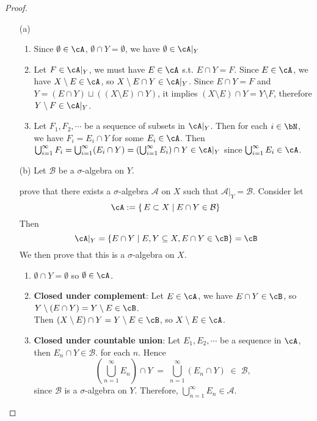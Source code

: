 \documentclass[lang=cn,11pt]{elegantbook}
\begin{document}
\begin{proof}
    \begin{itemize}
    \item[(a)] 
    \begin{enumerate}
        \item Since $\emptyset \in\cA$, $\emptyset \cap Y = \emptyset$, we have $\emptyset \in\cA|_{Y}$
        \item Let $F \in \cA|_{Y}$, we must have $E \in \cA$ s.t. $E\cap Y = F$. Since $E\in \cA$, we have $X\setminus E \in \cA$, so $X \setminus E \cap Y \in \cA|_{Y}$. Since $E \cap Y = F$ and $Y = (E \cap Y) \sqcup ((X \setminus E) \cap Y)$, it implies $(X \setminus E) \cap Y = Y\setminus F$, therefore $Y \setminus F \in \cA|_{Y}$.
        \item Let $F_1, F_2,\cdots$ be a sequence of subsets in $\cA|_{Y}$. Then for each $i\in \bN$, we have $F_i = E_i \cap Y$ for some $E_i \in \cA$. Then $\union_{i=1}^\infty F_i = \union_{i=1}^\infty (E_i\cap Y) = (\union_{i=1}^\infty E_i) \cap Y \in \cA|_{Y}$ since $\union_{i=1}^\infty E_i \in \cA$. 
    \end{enumerate}
    
    \item[(b)] Let $\mathcal{B}$ be a $\sigma$-algebra on $Y$.
    
    
    prove that there exists a $\sigma$-algebra $\mathcal{A}$ on $X$ such that $\mathcal{A}|_Y = \mathcal{B}$.
    Consider let 
    $$
    \cA := \{\,E \subset X \mid E \cap Y \in \mathcal{B}\}
    $$
    Then 
    $$
    \cA |_{Y} = \{ E \cap Y \mid E,Y\sub X,E \cap Y \in \cB  \} = \cB
    $$            
    We then prove that this is a $\sigma$-algebra on $X$. \\
    \begin{enumerate}
        \item  $\emptyset \cap Y = \emptyset$ so $\emptyset \in \cA$. 
        \item \textbf{Closed under complement}: Let $E \in \cA$, we have $E \cap Y \in \cB$, so $Y \setminus (E\cap Y ) = Y\setminus E \in \cB$.\\
        Then $(X\setminus E) \cap Y  = Y \setminus E 
        \in \cB$, so $X\setminus E \in \cA$. 
        \item \textbf{Closed under countable union}: Let $E_1,E_2,\cdots$ be a sequence in $\cA$, then \(E_n \cap Y \in \mathcal{B}\). for each $n$. 
        Hence
     \[
       \left(\bigcup_{n=1}^\infty E_n\right) \cap Y
       \;=\; \bigcup_{n=1}^\infty (E_n \cap Y)
       \;\in\; \mathcal{B},
     \]
     since \(\mathcal{B}\) is a \(\sigma\)-algebra on \(Y\).  Therefore, \(\bigcup_{n=1}^\infty E_n \in \mathcal{A}\).  
     

\end{enumerate}
\end{itemize}
\end{proof}
\end{document}

